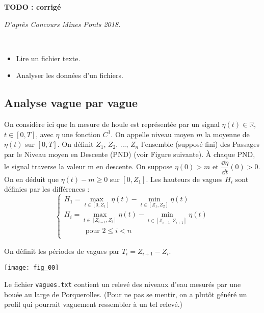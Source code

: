 
%


\textbf{TODO : corrigé}

\begin{flushright}
\textit{D'après Concours Mines Ponts 2018.}
\end{flushright}
\begin{obj} ~\\
\begin{itemize}
\item Lire un fichier texte.
\item Analyser les données d'un fichiers. 
\end{itemize}
\end{obj}

\subsection*{Analyse vague par vague}

On considère ici que la mesure de houle est représentée par un signal $\eta(t) \in \mathbb{R}$, $t\in[0,T]$, avec
$\eta$ une fonction $C^1$.
On appelle niveau moyen $m$ la moyenne de $\eta(t)$ sur $[0, T]$.
On définit $Z_1$, $Z_2$, ..., $Z_n$ l’ensemble (supposé fini) des Passages par le Niveau moyen en Descente
(PND) (voir Figure suivante). À chaque PND, le signal traverse la valeur m en descente.
On suppose $\eta(0)>m$ et $\dfrac{\dd \eta }{\dd t}(0)>0$. On en déduit que $\eta(t)-m\geq 0$ sur $\left[0, Z_1\right]$.
Les hauteurs de vagues $H_i$ sont définies par les différences :
$$
 \left\{ 
\begin{array}{l}
H_1 = \max_{t\in[0,Z_1]} \eta(t)-\min_{t\in[Z_1,Z_2]} \eta(t) \\
H_i = \max_{t\in[Z_{i-1},Z_i]} \eta(t)-\min_{t\in[Z_{i-1},Z_{i+1}]} \eta(t) \\
\quad \quad \quad \text{pour }2\leq i <  n\\
\end{array}
\right.
$$

On définit les périodes de vagues par $T_i = Z_{i+1}-Z_i$.

\begin{center}
\texttt{[image: fig\_00]}
\end{center}



Le fichier \texttt{vagues.txt} contient un relevé des niveaux d'eau mesurés par une bouée au large de Porquerolles. (Pour ne pas se mentir, on a plutôt généré un profil qui pourrait vaguement ressembler à un tel relevé.)

